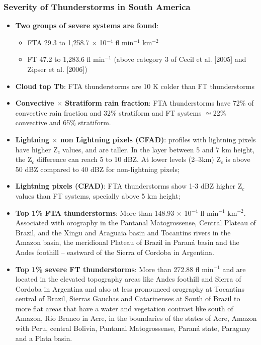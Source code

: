 \documentclass[smaller]{beamer}
\begin{document}
\begin{frame}
\frametitle{Severity of Thunderstorms in South America}
\begin{itemize}
\item \textbf{Two groups of severe systems are found}:
\begin{itemize}
\item FTA 29.3 to 1,258.7 $\times$ 10$^{-4}$ fl min$^{-1}$ km$^{-2}$
\item FT 47.2 to 1,283.6 fl min$^{-1}$ (above category 3 of Cecil et al. [2005] and Zipser et al. [2006])
\end{itemize}
\item \textbf{Cloud top Tb}: FTA thunderstorms are 10 K colder than FT thunderstorms
\item \textbf{Convective $\times$ Stratiform rain fraction}: FTA thunderstorms have 72\% of convective rain fraction and 32\% stratiform and FT systems $\simeq$22\% convective and 65\% stratiform.
\item \textbf{Lightning $\times$ non Lightning pixels (CFAD)}: profiles with lightning pixels have higher Z$_c$ values, and are taller. In the layer between 5 and 7 km height, the Z$_c$ difference can reach 5 to 10 dBZ. At lower levels (2--3km) Z$_c$ is above 50 dBZ compared to 40 dBZ for non-lightning pixels;
\item \textbf{Lightning pixels (CFAD)}: FTA thunderstorms show 1-3 dBZ higher Z$_c$ values than FT systems, specially above 5 km height;
\end{itemize}
\end{frame}

\begin{frame}
\begin{itemize}
\item \textbf{Top 1\% FTA thunderstorms}: More than 148.93 $\times$ 10$^{-4}$ fl min$^{-1}$ km$^{-2}$. Associated with orography in the Pantanal Matogrossense, Central Plateau of Brazil, and the Xingu and Araguaia basin and Tocantins rivers in the Amazon basin, the meridional Plateau of Brazil in Paraná basin and the Andes foothill -- eastward of the Sierra of Cordoba in Argentina.
\item \textbf{Top 1\% severe FT thunderstorms}: More than  272.88 fl min$^{-1}$ and are located in the elevated topography areas like Andes foothill and Sierra of Cordoba in Argentina and also at less pronounced orography at Tocantins central of Brazil, Sierras Gauchas and Catarinenses at South of Brazil to more flat areas that have a water and vegetation contrast like south of Amazon, Rio Branco in Acre, in the boundaries of the states of Acre, Amazon with Peru, central Bolivia, Pantanal Matogrossense, Paraná state, Paraguay and a Plata basin.
\end{itemize}

\end{frame}
\end{document}
